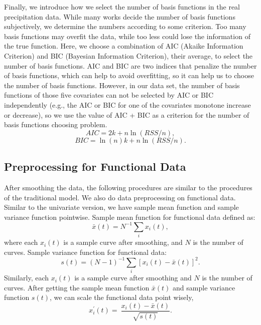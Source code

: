 Finally, we introduce how we select the number of basis functions in the real precipitation data. While many works decide the number of basis functions subjectively, we determine the numbers according to some criterion. Too many basis functions may overfit the data, while too less could lose the information of the true function. Here, we choose a combination of AIC (Akaike Information Criterion) and BIC (Bayesian Information Criterion), their average, to select the number of basis functions. AIC and BIC are two indices that penalize the number of basis functions, which can help to avoid overfitting, so it can help us to choose the number of basis functions. However, in our data set, the number of basis functions of those five covariates can not be selected by AIC or BIC independently (e.g., the AIC or BIC for one of the covariates monotone increase or decrease), so we use the value of AIC + BIC as a criterion for the number of basis functions choosing problem.
$$AIC=2k+n\ln{\left(RSS/n\right)},$$
$$BIC=\ln{(n)}k+n\ln{\left(RSS/n\right)}.$$

\subsection{Preprocessing for Functional Data}
After smoothing the data, the following procedures are similar to the procedures of the traditional model. We also do data preprocessing on functional data. Similar to the univariate version, we have sample mean function and sample variance function pointwise. Sample mean function for functional data defined as:
$$\bar{x}\left(t\right)=N^{-1}\sum_{i}{x_i\left(t\right)},$$
where each $x_{i}(t)$ is a sample curve after smoothing, and $N$ is the number of curves. Sample variance function for functional data:
$$s\left(t\right)=\left(N-1\right)^{-1}\sum_{i}\left[x_i\left(t\right)-\bar{x}\left(t\right)\right]^2.$$
Similarly, each $x_{i}(t)$ is a sample curve after smoothing and $N$ is the number of curves.
After getting the sample mean function $\bar{x}(t)$ and sample variance function $s(t)$, we can scale the functional data point wisely,
$$x_i^\prime\left(t\right)=\ \frac{x_i\left(t\right)-\bar{x}\left(t\right)}{\sqrt{s\left(t\right)}}.$$

